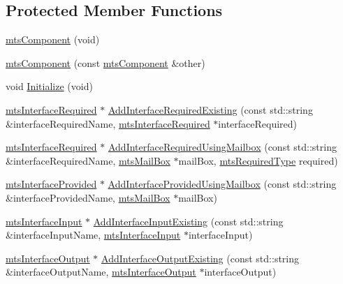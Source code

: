 \subsection*{Protected Member Functions}
\begin{DoxyCompactItemize}
\item 
\hyperlink{classmts_component_a1fae65e0de8abf2c69d56abaeb285d8a}{mts\+Component} (void)
\item 
\hyperlink{classmts_component_a6da874fdd59045ae4b0f6db8fa9daae8}{mts\+Component} (const \hyperlink{classmts_component}{mts\+Component} \&other)
\item 
void \hyperlink{classmts_component_ae2f9fa8cd2b8081e1c6311cda35e0ef4}{Initialize} (void)
\item 
\hyperlink{classmts_interface_required}{mts\+Interface\+Required} $\ast$ \hyperlink{classmts_component_a75f7bc556154f54e36952d588a770355}{Add\+Interface\+Required\+Existing} (const std\+::string \&interface\+Required\+Name, \hyperlink{classmts_interface_required}{mts\+Interface\+Required} $\ast$interface\+Required)
\item 
\hyperlink{classmts_interface_required}{mts\+Interface\+Required} $\ast$ \hyperlink{classmts_component_a0aaed1ea809e3c472576716f035c4478}{Add\+Interface\+Required\+Using\+Mailbox} (const std\+::string \&interface\+Required\+Name, \hyperlink{classmts_mail_box}{mts\+Mail\+Box} $\ast$mail\+Box, \hyperlink{mts_forward_declarations_8h_a9ef1ce54724afde7802db326ff8606f3}{mts\+Required\+Type} required)
\item 
\hyperlink{classmts_interface_provided}{mts\+Interface\+Provided} $\ast$ \hyperlink{classmts_component_ac0f8af0faab3ef1cc01e2faead1987c1}{Add\+Interface\+Provided\+Using\+Mailbox} (const std\+::string \&interface\+Provided\+Name, \hyperlink{classmts_mail_box}{mts\+Mail\+Box} $\ast$mail\+Box)
\item 
\hyperlink{classmts_interface_input}{mts\+Interface\+Input} $\ast$ \hyperlink{classmts_component_a5a475a2fe2b9d95273cfdab497462796}{Add\+Interface\+Input\+Existing} (const std\+::string \&interface\+Input\+Name, \hyperlink{classmts_interface_input}{mts\+Interface\+Input} $\ast$interface\+Input)
\item 
\hyperlink{classmts_interface_output}{mts\+Interface\+Output} $\ast$ \hyperlink{classmts_component_a79135dc4352611e134d668c92b381a90}{Add\+Interface\+Output\+Existing} (const std\+::string \&interface\+Output\+Name, \hyperlink{classmts_interface_output}{mts\+Interface\+Output} $\ast$interface\+Output)
\item 

\end{DoxyCompactItemize}

